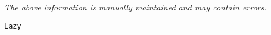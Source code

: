 \label{pkg:lazy}

{\tiny \it The above information is manually maintained and may contain errors.}
\begin{verbatim}
Lazy
\end{verbatim}
